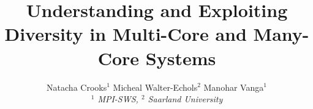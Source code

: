 

\newif \ifDraft\Drafttrue

\ifDraft
  \newcommand{\Comment}[1]{\textbf{\textsl{#1}}}
\else
  \newcommand{\Comment}[1]{\relax}
\fi

\newcommand{\gernot}[1]{\Comment{#1 [gernot]}}


\title{\vspace{-0.8cm}\textbf{
Understanding and Exploiting Diversity in Multi-Core and Many-Core Systems
}}

\author{
Natacha Crooks$^1$ \quad
Micheal Walter-Echols$^2$ \quad
Manohar Vanga$^1$
\\ \emph{$^1$ MPI-SWS, $^2$ Saarland University}
}
\date{\vspace{-12pt}}




\maketitle










\fontsize{8}{8.2}
\selectfont


\normalsize

